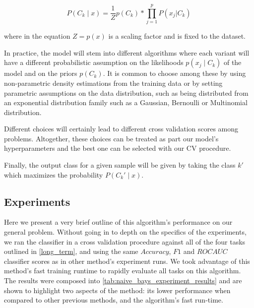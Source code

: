 \begin{equation}\label{eq:posteriorProbabilityDecomposition3}
P(C_k \mid x) = \frac{1}{Z} p(C_k) * \prod_{j=1}^{p}  P(x_j | C_k)
\end{equation}

where in the equation $Z = p(x)$ is a scaling factor and is fixed to the dataset.

In practice, the model will stem into different algorithms where each variant will have a different probabilistic assumption on the likelihoods $p(x_j \mid C_k)$ of the model and on the priors $p(C_k)$.
It is common to choose among these by  using non-parametric density estimations from the training data or by setting parametric assumptions on the data distribution, such as being distributed from an exponential distribution family such as a Gaussian, Bernoulli or Multinomial distribution.

Different choices will certainly lead to different cross validation scores among problems.
Altogether, these choices can be treated as part our model's hyperparameters and the best one can be selected with our CV procedure.

Finally, the output class for a given sample will be given by taking the class $k'$ which maximizes the probability $P(C_k' \mid x)$.

\subsection{Experiments}\label{subsection:naive_bayes_experiments}

Here we present a very brief outline of this algorithm's performance on our general problem.
Without going in to depth on the specifics of the experiments, we ran the classifier in a cross validation procedure against all of the four tasks outlined in \cref{long_term}, and using the same $Accuracy$, $F1$ and $ROC AUC$ classifier scores as in other method's experiment runs.
We took advantage of this method's fast training runtime to rapidly evaluate all tasks on this algorithm.
The results were composed into \cref{tab:naive_bays_experiment_results} and are shown to highlight two aspects of the method: its lower performance when compared to other previous methods, and the algorithm's fast run-time.


